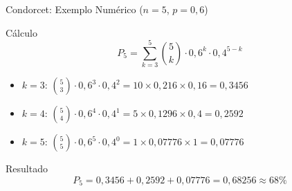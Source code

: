 \documentclass{libs/ufc_format}
\begin{document}
\begin{frame}{Condorcet: Exemplo Numérico ($n=5$, $p=0{,}6$)}
    \begin{block}{Cálculo}
        \[
        P_5 = \sum_{k=3}^{5} \binom{5}{k} \cdot 0{,}6^k \cdot 0{,}4^{5-k}
        \]
    \end{block}

    \vspace{0.15cm}

    \begin{itemize}
        \item $k=3$: $\binom{5}{3} \cdot 0{,}6^3 \cdot 0{,}4^2 = 10 \times 0{,}216 \times 0{,}16 = 0{,}3456$
        \item $k=4$: $\binom{5}{4} \cdot 0{,}6^4 \cdot 0{,}4^1 = 5 \times 0{,}1296 \times 0{,}4 = 0{,}2592$
        \item $k=5$: $\binom{5}{5} \cdot 0{,}6^5 \cdot 0{,}4^0 = 1 \times 0{,}07776 \times 1 = 0{,}07776$
    \end{itemize}

    \vspace{0.15cm}

    \begin{exampleblock}{Resultado}
        \[
        P_5 = 0{,}3456 + 0{,}2592 + 0{,}07776 = 0{,}68256 \approx 68\%
        \]
    \end{exampleblock}

\end{frame}


\end{document}
